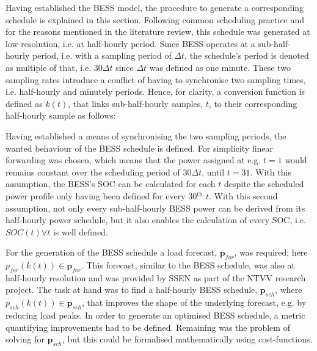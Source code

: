 Having established the BESS model, the procedure to generate a corresponding schedule is explained in this section.
Following common scheduling practice and for the reasons mentioned in the literature review, this schedule was generated at low-resolution, i.e. at half-hourly period.
Since BESS operates at a sub-half-hourly period, i.e. with a sampling period of $\Delta t$, the schedule's period is denoted as multiple of that, i.e. $30\Delta t$ since $\Delta t$ was defined as one minute.
These two sampling rates introduce a conflict of having to synchronise two sampling times, i.e. half-hourly and minutely periods.
Hence, for clarity, a conversion function is defined as $k(t)$, that links sub-half-hourly samples, $t$, to their corresponding half-hourly sample as follows:



Having established a means of synchronising the two sampling periods, the wanted behaviour of the BESS schedule is defined.
For simplicity linear forwarding was chosen, which means that the power assigned at e.g. $t=1$ would remains constant over the scheduling period of $30\Delta t$, until $t=31$.
With this assumption, the BESS's SOC can be calculated for each $t$ despite the scheduled power profile only having been defined for every 30$^\text{th}$ $t$.
With this second assumption, not only every sub-half-hourly BESS power can be derived from its half-hourly power schedule, but it also enables the calculation of every SOC, i.e. $SOC(t) \forall t$ is well defined.


For the generation of the BESS schedule a load forecast, $\textbf{p}_{for}$, was required; here $p_{for}(k(t)) \in \textbf{p}_{for}$.
This forecast, similar to the BESS schedule, was also at half-hourly resolution and was provided by SSEN as part of the NTVV research project.
The task at hand was to find a half-hourly BESS schedule, $\textbf{p}_{sch}$, where $p_{sch}(k(t)) \in \textbf{p}_{sch}$, that improves the shape of the underlying forecast, e.g. by reducing load peaks.
In order to generate an optimised BESS schedule, a metric quantifying improvements had to be defined.
Remaining was the problem of solving for $\textbf{p}_{sch}$, but this could be formalised mathematically using cost-functions.


